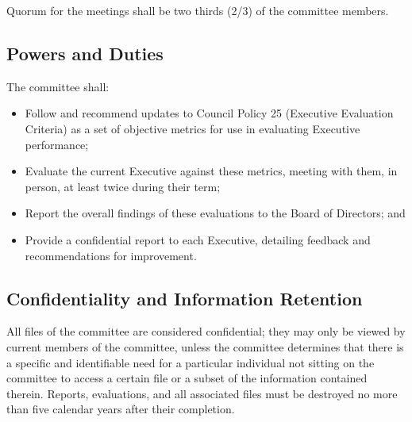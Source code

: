 Quorum for the meetings shall be two thirds (2/3) of the committee members.

\subsection{Powers and Duties}

The committee shall:
\begin{itemize}
	\item Follow and recommend updates to Council Policy 25 (Executive
	      Evaluation Criteria) as a set of objective metrics for use in
	      evaluating Executive performance;
	\item Evaluate the current Executive against these metrics, meeting with
	      them, in person, at least twice during their term;
	\item Report the overall findings of these evaluations to the Board of
	      Directors; and
	\item Provide a confidential report to each Executive, detailing feedback
	      and recommendations for improvement.

\end{itemize}

\subsection{Confidentiality and Information Retention}

All files of the committee are considered confidential; they may only be viewed by current members of the committee,
unless the committee determines that there is a specific and identifiable need for a particular individual not sitting on the committee to access a certain file or a subset of the information contained therein.
Reports, evaluations, and all associated files must be destroyed no more than five calendar years after their completion.

